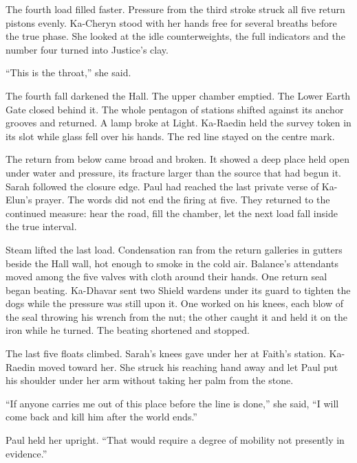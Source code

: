 The fourth load filled faster. Pressure from the third stroke struck all five return pistons evenly. Ka-Cheryn stood with her hands free for several breaths before the true phase. She looked at the idle counterweights, the full indicators and the number four turned into Justice's clay.\par

``This is the throat,'' she said.\par

The fourth fall darkened the Hall. The upper chamber emptied. The Lower Earth Gate closed behind it. The whole pentagon of stations shifted against its anchor grooves and returned. A lamp broke at Light. Ka-Raedin held the survey token in its slot while glass fell over his hands. The red line stayed on the centre mark.\par

The return from below came broad and broken. It showed a deep place held open under water and pressure, its fracture larger than the source that had begun it. Sarah followed the closure edge. Paul had reached the last private verse of Ka-Elun's prayer. The words did not end the firing at five. They returned to the continued measure: hear the road, fill the chamber, let the next load fall inside the true interval.\par

Steam lifted the last load. Condensation ran from the return galleries in gutters beside the Hall wall, hot enough to smoke in the cold air. Balance's attendants moved among the five valves with cloth around their hands. One return seal began beating. Ka-Dhavar sent two Shield wardens under its guard to tighten the dogs while the pressure was still upon it. One worked on his knees, each blow of the seal throwing his wrench from the nut; the other caught it and held it on the iron while he turned. The beating shortened and stopped.\par

The last five floats climbed. Sarah's knees gave under her at Faith's station. Ka-Raedin moved toward her. She struck his reaching hand away and let Paul put his shoulder under her arm without taking her palm from the stone.\par

``If anyone carries me out of this place before the line is done,'' she said, ``I will come back and kill him after the world ends.''\par

Paul held her upright. ``That would require a degree of mobility not presently in evidence.''\par

